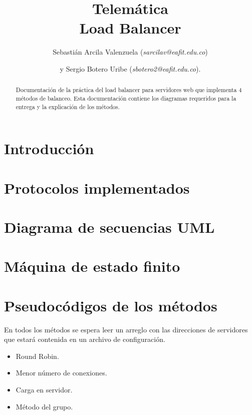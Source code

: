 \documentclass[
	final,
	notitlepage,
	narroweqnarray,
	inline,
	twoside,
	]{ieee}
\begin{document}
\title[Load Balancer]{
       Telemática\\ Load Balancer}


\author[]{Sebastián Arcila Valenzuela (\textit{sarcilav@eafit.edu.co})
\and{}y Sergio Botero Uribe (\textit{sbotero2@eafit.edu.co}).
}

\titletext{, \today}
\maketitle               

\begin{abstract} 
Documentación de la práctica del load balancer para servidores web que implementa 4 métodos de balanceo. Esta documentación
contiene los diagramas requeridos para la entrega y la explicación de los métodos.
\end{abstract}

\section{Introducción}
	

\section{Protocolos implementados}
	

\section{Diagrama de secuencias UML}
	

\section{Máquina de estado finito}
	
	
\section{Pseudocódigos de los métodos}

	En todos los métodos se espera leer un arreglo con las direcciones de servidores que estará contenida en un archivo de configuración.
	\begin{itemize}
	\item Round Robin.
	
	\item Menor número de conexiones.
	
	\item Carga en servidor.
	
	\item Método del grupo.
	
	\end{itemize}
	
\end{document}
